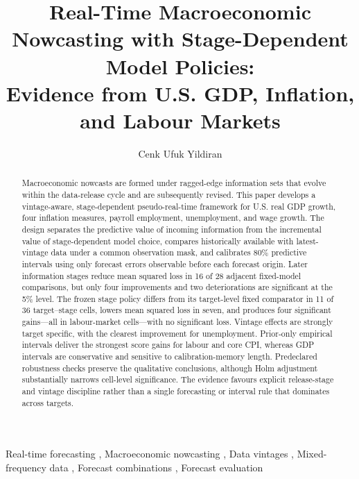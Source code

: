 \documentclass[preprint,12pt,authoryear]{elsarticle}
\begin{document}
\begin{frontmatter}

\title{Real-Time Macroeconomic Nowcasting with Stage-Dependent Model Policies:\\
Evidence from U.S. GDP, Inflation, and Labour Markets}

\author[inst1]{Cenk Ufuk Yildiran}

\address[inst1]{Independent Researcher}

\begin{abstract}
Macroeconomic nowcasts are formed under ragged-edge information sets that evolve
within the data-release cycle and are subsequently revised. This paper develops
a vintage-aware, stage-dependent pseudo-real-time framework for U.S. real GDP
growth, four inflation measures, payroll employment, unemployment, and wage
growth. The design separates the predictive value of incoming information from
the incremental value of stage-dependent model choice, compares historically
available with latest-vintage data under a common observation mask, and
calibrates 80\% predictive intervals using only forecast errors observable
before each forecast origin. Later information stages reduce mean squared loss
in 16 of 28 adjacent fixed-model comparisons, but only four improvements and
two deteriorations are significant at the 5\% level. The frozen stage policy
differs from its target-level fixed comparator in 11 of 36 target--stage cells,
lowers mean squared loss in seven, and produces four significant gains---all in
labour-market cells---with no significant loss. Vintage effects are strongly
target specific, with the clearest improvement for unemployment. Prior-only
empirical intervals deliver the strongest score gains for labour and core CPI,
whereas GDP intervals are conservative and sensitive to calibration-memory
length. Predeclared robustness checks preserve the qualitative conclusions,
although Holm adjustment substantially narrows cell-level significance. The
evidence favours explicit release-stage and vintage discipline rather than a
single forecasting or interval rule that dominates across targets.
\end{abstract}

\begin{keyword}
Real-time forecasting \sep
Macroeconomic nowcasting \sep
Data vintages \sep
Mixed-frequency data \sep
Forecast combinations \sep
Forecast evaluation
\end{keyword}

\end{frontmatter}
\end{document}
